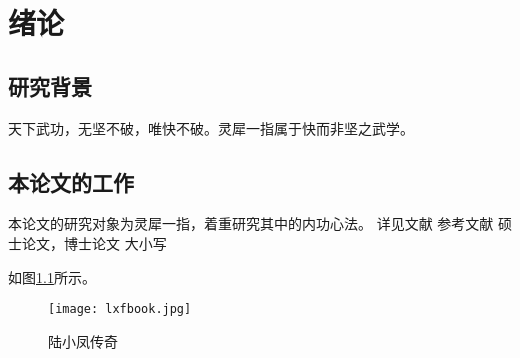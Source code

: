 \chapter{绪论}
\section{研究背景}
天下武功，无坚不破，唯快不破。灵犀一指属于快而非坚之武学。


\section{本论文的工作}
本论文的研究对象为灵犀一指，着重研究其中的内功心法。
详见文献\cite{Peebles2001-100-100}\parencite{Babu2014--}
参考文献\cite[见][49页]{于潇2012-1518-1523}\parencite[见][49页]{Babu2014--}
硕士论文\cite{zhouGPS2015}，博士论文\cite{余勇1998--}
大小写\cite{liu_statistical_2017}

如图\ref{lxfbook}所示。

\begin{figure}
    \centering
    \texttt{[image: lxfbook.jpg]}
    \caption{陆小凤传奇\label{lxfbook}}
\end{figure}
